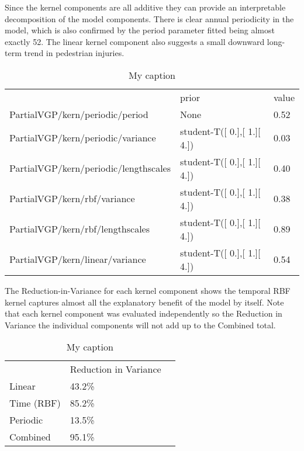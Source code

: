 
Since the kernel components are all additive they can provide an interpretable decomposition of the model components. There is clear annual periodicity in the model, which is also confirmed by the period parameter fitted being almost exactly 52. The linear kernel component also suggests a small downward long-term trend in pedestrian injuries.

\begin{table}[]
\centering
\caption{My caption}
\label{citywide_parameters}
\begin{tabular}{lll}
                                      & prior                                   & value \\
PartialVGP/kern/periodic/period       & None                                    & 0.52 \\
PartialVGP/kern/periodic/variance     & student-T({[} 0.{]},{[} 1.{]}{[} 4.{]}) & 0.03  \\
PartialVGP/kern/periodic/lengthscales & student-T({[} 0.{]},{[} 1.{]}{[} 4.{]}) & 0.40  \\
PartialVGP/kern/rbf/variance          & student-T({[} 0.{]},{[} 1.{]}{[} 4.{]}) & 0.38  \\
PartialVGP/kern/rbf/lengthscales      & student-T({[} 0.{]},{[} 1.{]}{[} 4.{]}) & 0.89  \\
PartialVGP/kern/linear/variance       & student-T({[} 0.{]},{[} 1.{]}{[} 4.{]}) & 0.54
\end{tabular}
\end{table}



The Reduction-in-Variance for each kernel component shows the temporal RBF kernel captures almost all the explanatory benefit of the model by itself. Note that each kernel component was evaluated independently so the Reduction in Variance the individual components will not add up to the Combined total. \par

\begin{table}[]
\centering
\caption{My caption}
\label{variance_citywide}
\begin{tabular}{@{}lll@{}}
           & Reduction in Variance &  \\
Linear     & 43.2\%                &  \\
Time (RBF) & 85.2\%                &  \\
Periodic   & 13.5\%                &  \\
Combined   & 95.1\%                &
\end{tabular}
\end{table}

